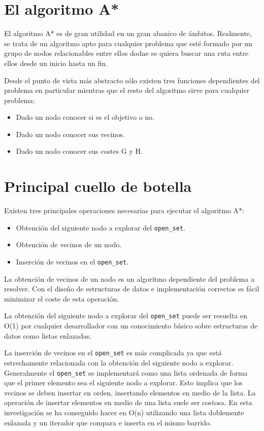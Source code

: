 
\section{El algoritmo A*}

El algoritmo A* es de gran utilidad en un gran abanico de ámbitos.
Realmente, se trata de un algoritmo apto para cualquier problema
que esté formado por un grupo de nodos relacionables entre ellos
dodne se quiera buscar una ruta entre ellos desde un inicio hasta
un fin.

Desde el punto de vista más abstracto sólo existen tres funciones
dependientes del problema en particular mientras que el resto
del algoritmo sirve para cualquier problema:

\begin{itemize}[itemsep=0.25px]
    \item Dado un nodo conocer si es el objetivo o no.
    \item Dado un nodo conocer sus vecinos.
    \item Dado un nodo conocer sus costes G y H.
\end{itemize}

\section{Principal cuello de botella}

Existen tres principales operaciones necesarias para
ejecutar el algoritmo A*:

\begin{itemize}[itemsep=0.25px]
    \item Obtención del siguiente nodo a explorar del \lstinline{open_set}.
    \item Obtención de vecinos de un nodo.
    \item Inserción de vecinos en el \lstinline{open_set}.
\end{itemize}

La obtención de vecinos de un nodo es un algoritmo dependiente del problema a resolver.
Con el diseño de estructuras de datos e implementación correctos es fácil
minimizar el coste de esta operación.

La obtención del siguiente nodo a explorar del \lstinline{open_set}
puede ser resuelta en O(1) por cualquier desarrollador con un conocimiento
básico sobre estructuras de datos como listas enlazadas.

La inserción de vecinos en el \lstinline{open_set} es más complicada
ya que está estrechamente relacionada con la obtención del siguiente nodo
a explorar.
Generalmente el \lstinline{open_set} se implementará como una lista ordenada
de forma que el primer elemento sea el siguiente nodo a explorar.
Esto implica que los vecinos se deben insertar en orden,
insertando elementos en medio de la lista.
La operación de insertar elementos en medio de una lista suele ser
costosa.
En esta investigación se ha conseguido hacer en O(n) utilizando
una lista doblemente enlazada y un iterador que compara e inserta
en el mismo barrido.

